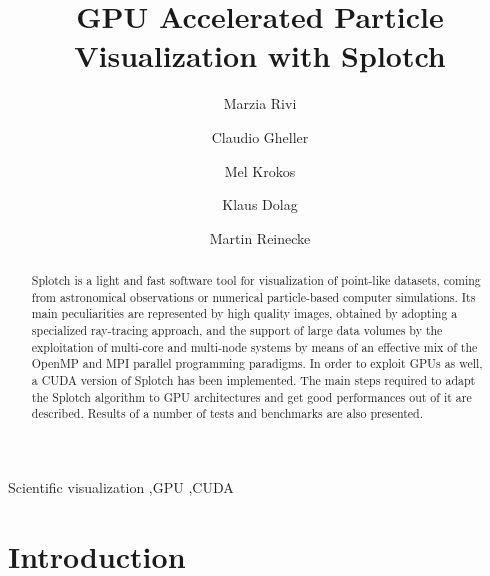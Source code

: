 \documentclass[1p]{elsarticle}
\begin{document}
\begin{frontmatter}

\title{GPU Accelerated Particle Visualization with Splotch}
\author[1]{Marzia Rivi} 
\address[1]{Department of Physics, University of Oxford, Keble Road, OX1 3RH Oxford, United Kingdom}
\author[2]{Claudio Gheller}
\address[2]{ETH-CSCS, via Trevano 131, 6900 Lugano, Switzerland}
\author[3]{Mel Krokos}
\address[3]{...  University of Portsmouth, ...}
\author[4]{Klaus Dolag}
\address[4]{}
\author[5]{Martin Reinecke}
\address[5]{}

\begin{abstract}
Splotch is a light and fast software tool for visualization of point-like datasets, coming from astronomical observations or numerical particle-based computer simulations. Its main peculiarities are represented by high quality images, obtained by adopting a specialized ray-tracing approach, and the support of large data volumes by the exploitation of multi-core and multi-node systems by means of an effective mix of the OpenMP and MPI parallel programming paradigms. In order to exploit GPUs as well, a CUDA version of Splotch has been implemented. The main steps required to adapt the Splotch algorithm to GPU architectures and get good performances out of it are described. Results of a number of tests and benchmarks are also presented. 
\end{abstract}

\begin{keyword}
Scientific visualization \sep GPU \sep CUDA
\end{keyword}

\end{frontmatter}

\section{Introduction}
\label{sec:intro}
\end{document}
